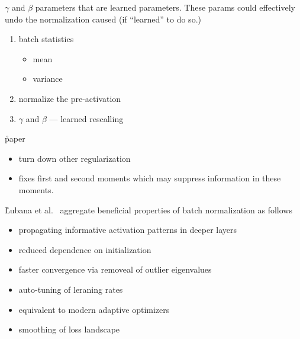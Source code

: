 \r{$\gamma$ and $\beta$ parameters that are learned parameters. These params could effectively undo the normalization caused (if ``learned'' to do so.)}


\begin{enumerate}[noitemsep,topsep=0pt]
	\item batch statistics
	\begin{itemize}[noitemsep,topsep=0pt]
		\item mean
		\item variance
	\end{itemize}
	\item normalize the pre-activation
	\item $\gamma$ and $\beta$ --- learned rescalling
\end{enumerate}




\r{paper~\cite{DBLP:journals/corr/abs-1905-02161}}
\begin{itemize}[noitemsep,topsep=0pt]
	\item turn down other regularization
	\item fixes first and second moments which may suppress information in these moments.
\end{itemize}




\r{Lubana et al.~\cite{DBLP:journals/corr/abs-2106-05956} aggregate beneficial properties of batch normalization as follows}
\begin{itemize}[noitemsep,topsep=0pt]
	\item propagating informative activation patterns in deeper layers
	\item reduced dependence on initialization
	\item faster convergence via removeal of outlier eigenvalues
	\item auto-tuning of leraning rates
	\item equivalent to modern adaptive optimizers
	\item smoothing of loss landscape
\end{itemize}

